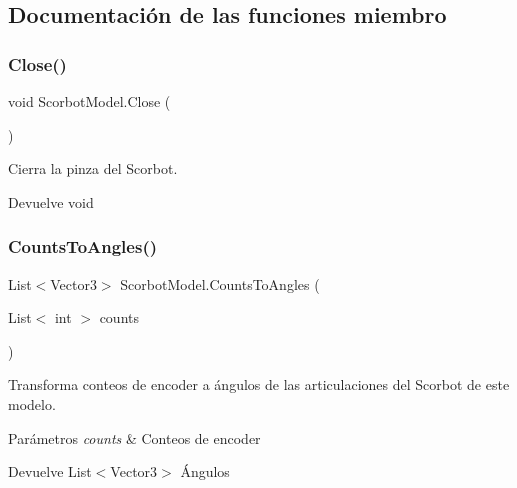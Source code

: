 \subsection{Documentación de las funciones miembro}
\mbox{\label{class_scorbot_model_a2f4d3c10d7f8ce39bc2fce114efcc97f}} 
\subsubsection{\texorpdfstring{Close()}{Close()}}
{\footnotesize\ttfamily void Scorbot\+Model.\+Close (\begin{DoxyParamCaption}{ }\end{DoxyParamCaption})\hspace{0.3cm}{\ttfamily [inline]}}

Cierra la pinza del Scorbot. \begin{DoxyReturn}{Devuelve}
void 
\end{DoxyReturn}
\mbox{\label{class_scorbot_model_a30c77a2653cea0ff41081d150b7e3bca}} 
\subsubsection{\texorpdfstring{CountsToAngles()}{CountsToAngles()}}
{\footnotesize\ttfamily List$<$Vector3$>$ Scorbot\+Model.\+Counts\+To\+Angles (\begin{DoxyParamCaption}\item[{List$<$ int $>$}]{counts }\end{DoxyParamCaption})\hspace{0.3cm}{\ttfamily [inline]}}

Transforma conteos de encoder a ángulos de las articulaciones del Scorbot de este modelo. 
\begin{DoxyParams}{Parámetros}
{\em counts} & Conteos de encoder \\
\hline
\end{DoxyParams}
\begin{DoxyReturn}{Devuelve}
List$<$\+Vector3$>$ Ángulos 
\end{DoxyReturn}
\mbox{\label{class_scorbot_model_ad09db01ea00a7f638ecbeabce57737cf}} 
